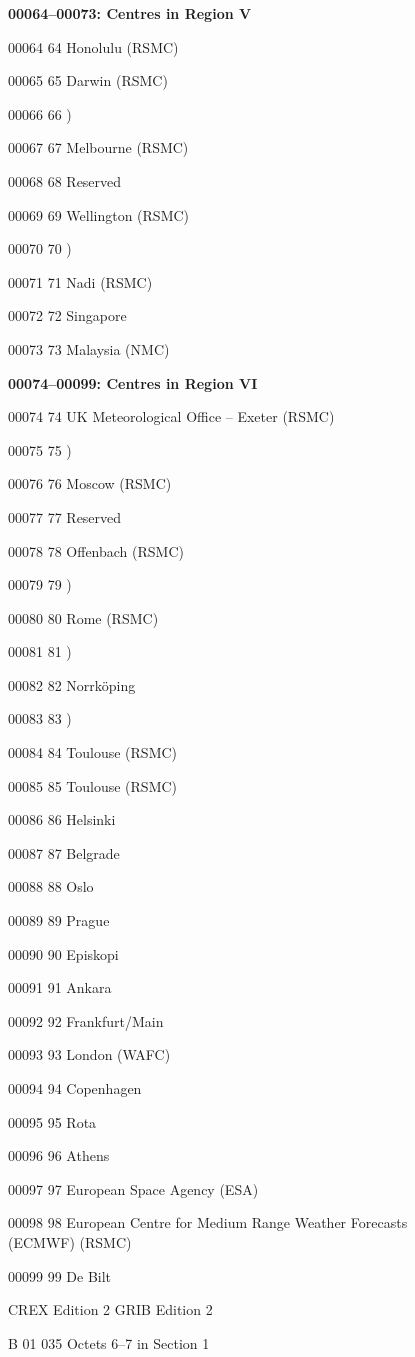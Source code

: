 \textbf{00064--00073: Centres in Region V}

00064 64 Honolulu (RSMC)

00065 65 Darwin (RSMC)

00066 66 )

00067 67 Melbourne (RSMC)

00068 68 Reserved

00069 69 Wellington (RSMC)

00070 70 )

00071 71 Nadi (RSMC)

00072 72 Singapore

00073 73 Malaysia (NMC)

\textbf{00074--00099: Centres in Region VI}

00074 74 UK Meteorological Office -- Exeter (RSMC)

00075 75 )

00076 76 Moscow (RSMC)

00077 77 Reserved

00078 78 Offenbach (RSMC)

00079 79 )

00080 80 Rome (RSMC)

00081 81 )

00082 82 Norrköping

00083 83 )

00084 84 Toulouse (RSMC)

00085 85 Toulouse (RSMC)

00086 86 Helsinki

00087 87 Belgrade

00088 88 Oslo

00089 89 Prague

00090 90 Episkopi

00091 91 Ankara

00092 92 Frankfurt/Main

00093 93 London (WAFC)

00094 94 Copenhagen

00095 95 Rota

00096 96 Athens

00097 97 European Space Agency (ESA)

00098 98 European Centre for Medium Range Weather Forecasts\\
(ECMWF) (RSMC)

00099 99 De Bilt

CREX Edition 2 GRIB Edition 2

B 01 035 Octets 6--7 in Section 1

